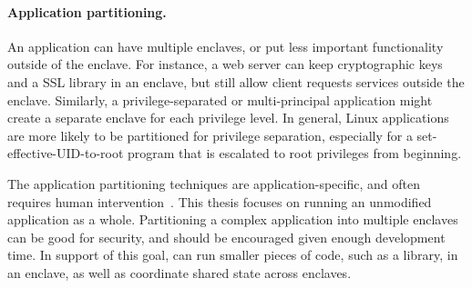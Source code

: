 \paragraph{Application partitioning.} An application can have multiple enclaves, or put less important functionality outside of the enclave.
For instance, a web server can keep cryptographic keys and a SSL library in an enclave,
but still allow client requests services
outside the enclave.
Similarly, a privilege-separated or multi-principal application might create a separate enclave for
each privilege level.
In general, Linux applications are more likely to be partitioned
for privilege separation,
especially for a set-effective-UID-to-root program that is escalated to root privileges from beginning.


The application partitioning techniques
are application-specific, and often requires human intervention~\cite{glamdring}.
This thesis focuses on running an unmodified application
as a whole.
Partitioning a complex application into multiple enclaves
can be good for security, and should be encouraged given enough development time.
In support of this goal,
\graphenesgx{} can run smaller pieces of code, such as a library, in an enclave, as well as
coordinate shared state across enclaves.



\begin{comment}
\fixmedp{Did a first cut at 2.2; needs to integrate the figure (or drop it).  I didn't know what to write for 2.3 yet.  I left the old text below for now (if there is anything you really want to save), but it needs to go away}

\subsection{Open Challenges}

\fixmedp{Here, I would give a taste of some of the issues we solve and why they are hard, like dynamic loading (and maybe fork or IPC).  Keep it short, a few paragraphs.}
\end{comment}



